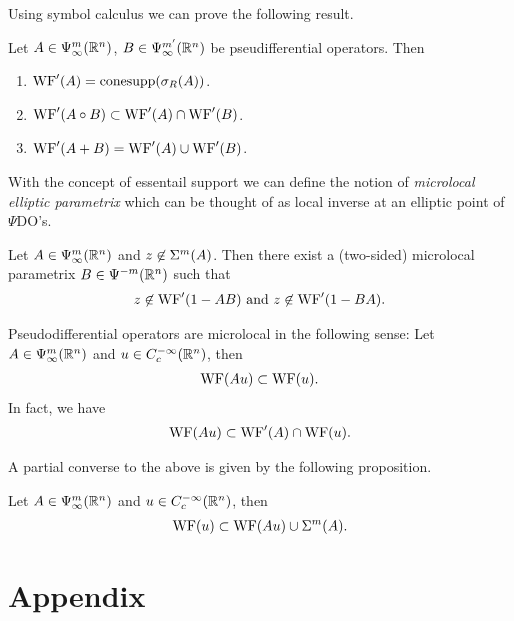 \documentclass{article}
\begin{document}
Using symbol calculus we can prove the following result. 
\begin{flemma}
    Let $A \in \Psi^m_\infty({\mathbb R}^n)$, $B \in \Psi^{m'}_\infty({\mathbb R}^n)$ be pseudifferential operators. Then 
    \begin{enumerate}
        \item $\mathrm{WF}'(A) = \mathrm{conesupp}(\sigma_R(A))$. 
        \item $\mathrm{WF}'(A\circ B) \subset \mathrm{WF}'(A) \cap \mathrm{WF}'(B)$. 
        \item $\mathrm{WF}'(A + B) = \mathrm{WF}'(A) \cup \mathrm{WF}'(B)$. 
    \end{enumerate}
\end{flemma}

With the concept of essentail support we can define the notion of \emph{microlocal elliptic parametrix} which can be thought of as local inverse at an elliptic point of $\Psi$DO's. 
\begin{fprop}
    Let $A \in \Psi^m_\infty({\mathbb R}^n)$ and $z \not \in \Sigma^m(A)$. Then there exist a (two-sided) microlocal parametrix $B \in \Psi^{-m}({\mathbb R}^n)$ such that 
    \begin{align*}
    z \not \in \mathrm{WF}'(1 - AB) \text{   and   } z \not \in \mathrm{WF}'(1 - BA). 
    \end{align*}
    
\end{fprop}


\begin{fprop}
    Pseudodifferential operators are microlocal in the following sense: 
    Let $A \in \Psi^m_\infty({\mathbb R}^n)$ and $u \in C^{-\infty}_c({\mathbb R}^n)$, then 
    \begin{align}
    \mathrm{WF}(Au) \subset \mathrm{WF}(u). 
    \end{align}
    In fact, we have 
    \begin{align*}
    \mathrm{WF}(Au) \subset \mathrm{WF}'(A) \cap \mathrm{WF}(u). 
    \end{align*}
\end{fprop}

A partial converse to the above is given by the following proposition. \\

\begin{fprop}
    Let $A \in \Psi^m_\infty({\mathbb R}^n)$ and $u \in C^{- \infty}_c({\mathbb R}^n)$, then 
    \begin{align*}
    \mathrm{WF}(u) \subset \mathrm{WF}(Au) \cup \Sigma^m(A).
    \end{align*}
\end{fprop}

\section{Appendix}
\end{document}
